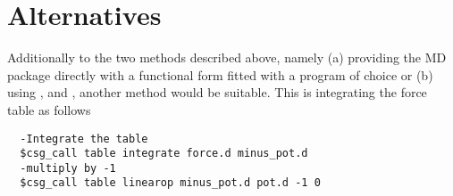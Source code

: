 \section{Alternatives}
Additionally to the two methods described above, namely (a) providing the MD package directly with a functional form fitted with a program of choice or (b) using ,  and , another method would be suitable. This is integrating the force table as follows
\begin{verbatim}
  -Integrate the table
  $csg_call table integrate force.d minus_pot.d
  -multiply by -1
  $csg_call table linearop minus_pot.d pot.d -1 0
\end{verbatim}
